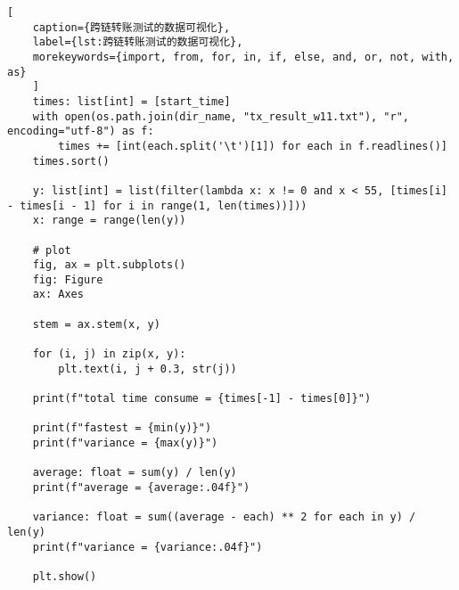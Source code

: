 \begin{appendices}
\begin{lstlisting}[
    caption={跨链转账测试的数据可视化},
    label={lst:跨链转账测试的数据可视化},
    morekeywords={import, from, for, in, if, else, and, or, not, with, as}
    ]
    times: list[int] = [start_time]
    with open(os.path.join(dir_name, "tx_result_w11.txt"), "r", encoding="utf-8") as f:
        times += [int(each.split('\t')[1]) for each in f.readlines()]
    times.sort()

    y: list[int] = list(filter(lambda x: x != 0 and x < 55, [times[i] - times[i - 1] for i in range(1, len(times))]))
    x: range = range(len(y))

    # plot
    fig, ax = plt.subplots()
    fig: Figure
    ax: Axes

    stem = ax.stem(x, y)

    for (i, j) in zip(x, y):
        plt.text(i, j + 0.3, str(j))

    print(f"total time consume = {times[-1] - times[0]}")

    print(f"fastest = {min(y)}")
    print(f"variance = {max(y)}")

    average: float = sum(y) / len(y)
    print(f"average = {average:.04f}")

    variance: float = sum((average - each) ** 2 for each in y) / len(y)
    print(f"variance = {variance:.04f}")

    plt.show()

  \end{lstlisting}
\end{appendices}
